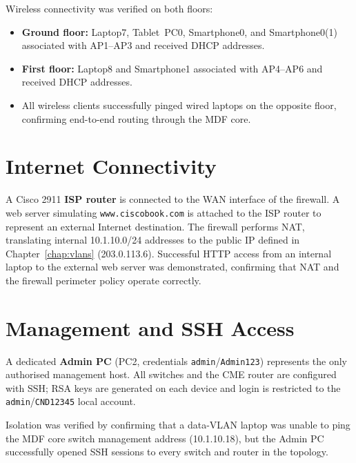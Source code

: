 \documentclass[12pt,a4paper]{report}
\begin{document}
Wireless connectivity was verified on both floors:
\begin{itemize}[noitemsep]
  \item \textbf{Ground floor:} Laptop7, Tablet~PC0, Smartphone0, and
        Smartphone0(1) associated with AP1--AP3 and received DHCP addresses.
  \item \textbf{First floor:} Laptop8 and Smartphone1 associated with
        AP4--AP6 and received DHCP addresses.
  \item All wireless clients successfully pinged wired laptops on the
        opposite floor, confirming end-to-end routing through the MDF core.
\end{itemize}

\section{Internet Connectivity}

A Cisco 2911 \textbf{ISP router} is connected to the WAN interface of
the firewall.
A web server simulating \texttt{www.ciscobook.com} is attached to the ISP
router to represent an external Internet destination.
The firewall performs NAT, translating internal 10.1.10.0/24 addresses
to the public IP defined in Chapter~\ref{chap:vlans} (203.0.113.6).
Successful HTTP access from an internal laptop to the external web server
was demonstrated, confirming that NAT and the firewall perimeter policy
operate correctly.

\section{Management and SSH Access}

A dedicated \textbf{Admin PC} (PC2, credentials
\texttt{admin}/\texttt{Admin123}) represents the only authorised
management host.
All switches and the CME router are configured with SSH; RSA keys are
generated on each device and login is restricted to the
\texttt{admin}/\texttt{CND12345} local account.

Isolation was verified by confirming that a data-VLAN laptop was unable
to ping the MDF core switch management address (10.1.10.18), but the
Admin PC successfully opened SSH sessions to every switch and router in
the topology.
\end{document}
